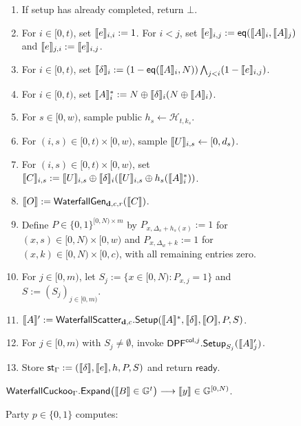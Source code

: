 \begin{figure}[H]
{\begin{minipage}{.95\textwidth}
\begin{enumerate}[nosep]
  \item If setup has already completed, return $\bot$.
  \item For $i\in[0,t)$, set $\share e_{i,i}:=1$.  For $i<j$, set
  $\share e_{i,j}:=\textsf{eq}(\share A_i,\share A_j)$ and
  $\share e_{j,i}:=\share e_{i,j}$.
  \item For $i\in[0,t)$, set
  $\share\delta_i:=(1-\textsf{eq}(\share A_i,N))
  \bigwedge_{j<i}(1-\share e_{i,j})$.
  \item For $i\in[0,t)$, set
  $\share A_i^*:=N\oplus\share\delta_i(N\oplus\share A_i)$.
  \item For $s\in[0,w)$, sample public $h_s\gets\mathcal H_{t,k_s}$.
  \item For $(i,s)\in[0,t)\times[0,w)$, sample
  $\share U_{i,s}\gets[0,d_s)$.
  \item For $(i,s)\in[0,t)\times[0,w)$, set
  $\share C_{i,s}:=\share U_{i,s}\oplus
  \share\delta_i(\share U_{i,s}\oplus h_s(\share A_i^*))$.
  \item $\share O:=\mathsf{WaterfallGen}_{\mathbf d,c,r}(\share C)$.
  \item Define $P\in\{0,1\}^{[0,N)\times m}$ by
  $P_{x,\Delta_s+h_s(x)}:=1$ for $(x,s)\in[0,N)\times[0,w)$ and
  $P_{x,\Delta_w+k}:=1$ for $(x,k)\in[0,N)\times[0,c)$, with all remaining
  entries zero.
  \item For $j\in[0,m)$, let
  $S_j:=\{x\in[0,N):P_{x,j}=1\}$ and $S:=(S_j)_{j\in[0,m)}$.
  \item $\share A':=
  \mathsf{WaterfallScatter}_{\mathbf d,c}.\mathsf{Setup}
  (\share A^*,\share\delta,\share O,P,S)$.
  \item For $j\in[0,m)$ with $S_j\neq\emptyset$, invoke
  $\mathsf{DPF}^{\mathsf{col},j}.\mathsf{Setup}_{S_j}(\share A'_j)$.
  \item Store $\mathsf{st}_\Gamma:=(\share\delta,\share e,h,P,S)$ and
  return $\mathsf{ready}$.
\end{enumerate}

\par\medskip
\noindent
$\mathsf{WaterfallCuckoo}_{\Gamma}.\mathsf{Expand}
 \bigl(\share B\in\mathbb G^t\bigr)
 \longrightarrow\share y\in\mathbb G^{[0,N)}$.
\par\smallskip
Party $p\in\{0,1\}$ computes:


\end{minipage}}
\end{figure}
